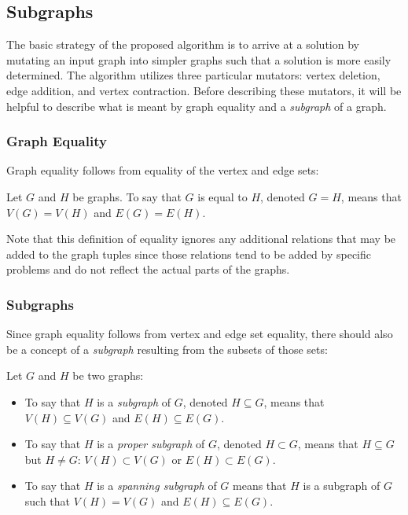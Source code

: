 \subsection{Subgraphs}

The basic strategy of the proposed algorithm is to arrive at a solution by mutating an input graph into simpler
graphs such that a solution is more easily determined.  The algorithm utilizes three particular mutators: vertex
deletion, edge addition, and vertex contraction.  Before describing these mutators, it will be helpful to describe
what is meant by graph equality and a \emph{subgraph} of a graph.

\subsubsection{Graph Equality}

Graph equality follows from equality of the vertex and edge sets:

\begin{definition}
  Let \(G\) and \(H\) be graphs.  To say that \(G\) is equal to \(H\), denoted \(G=H\), means that \(V(G)=V(H)\)
  and \(E(G)=E(H)\).
\end{definition}

Note that this definition of equality ignores any additional relations that may be added to the graph tuples since
those relations tend to be added by specific problems and do not reflect the actual parts of the graphs.

\subsubsection{Subgraphs}

Since graph equality follows from vertex and edge set equality, there should also be a concept of a \emph{subgraph}
resulting from the subsets of those sets:

\begin{definition}[Subgraph]
  Let \(G\) and \(H\) be two graphs:
  \begin{itemize}
  \item To say that \(H\) is a \emph{subgraph} of \(G\), denoted \(H\subseteq G\), means that \(V(H)\subseteq V(G)\)
    and \(E(H)\subseteq E(G)\).
  \item To say that \(H\) is a \emph{proper subgraph} of \(G\), denoted \(H\subset G\), means that \(H\subseteq G\)
    but \(H\ne G\): \(V(H)\subset V(G)\) or \(E(H)\subset E(G)\).
  \item To say that \(H\) is a \emph{spanning subgraph} of \(G\) means that \(H\) is a subgraph of \(G\) such that
    \(V(H)=V(G)\) and \(E(H)\subseteq E(G)\).
  \end{itemize}
\end{definition}

